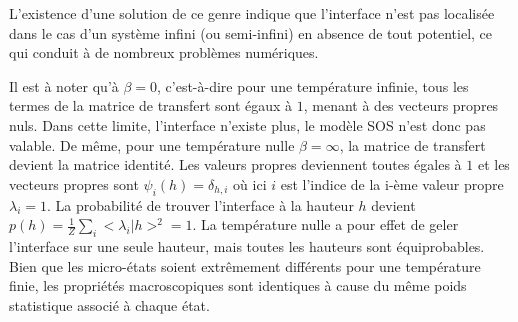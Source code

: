 
L'existence d'une solution de ce genre indique que l'interface n'est pas localisée dans le cas d'un système infini (ou semi-infini) en absence de tout potentiel, ce qui conduit à de nombreux problèmes numériques. 

Il est à noter qu'à $\beta=0$, c'est-à-dire pour une température infinie, tous les termes de la matrice de transfert sont égaux à $1$, menant à des vecteurs propres nuls. Dans cette limite, l'interface n'existe plus, le modèle SOS n'est donc pas valable. De même, pour une température nulle $\beta=\infty$, la matrice de transfert devient la matrice identité. Les valeurs propres deviennent toutes égales à $1$ et les vecteurs propres sont $\psi_i(h) = \delta_{h,i}$ où ici $i$ est l'indice de la i-ème valeur propre $\lambda_i = 1$. La probabilité de trouver l'interface à la hauteur $h$ devient $p(h) = \frac{1}{Z}\sum_{i} <\lambda_i | h >^2 = 1$. La température nulle a pour effet de geler l'interface sur une seule hauteur, mais toutes les hauteurs sont équiprobables. Bien que les micro-états soient extrêmement différents pour une température finie, les propriétés macroscopiques sont identiques à cause du même poids statistique associé à chaque état.


